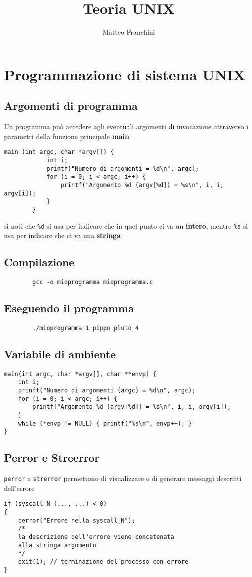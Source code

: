 \documentclass[italian,12pt,a4paper]{article}
\title{Teoria UNIX}
\author{Matteo Franchini}
\begin{document}
	\maketitle
	\tableofcontents
	\section{Programmazione di sistema UNIX}
	\subsection{Argomenti di programma}
	Un programma può accedere agli eventuali argomenti di invocazione attraverso i parametri della funzione principale \textbf{main}
	\begin{lstlisting}[xleftmargin=-5.5cm]
		main (int argc, char *argv[]) {
			int i;
			printf("Numero di argomenti = %d\n", argc);
			for (i = 0; i < argc; i++) {
				printf("Argomento %d (argv[%d]) = %s\n", i, i, argv[i]);
			}
		}
	\end{lstlisting}
	si noti che \verb|%d| si usa per indicare che in quel punto ci va un \textbf{intero}, mentre \verb|%s| si usa per indicare che ci va una \textbf{stringa}
	\subsection{Compilazione}
	\begin{verbatim}
		gcc -o mioprogramma mioprogramma.c
	\end{verbatim}
	\subsection{Eseguendo il programma}
	\begin{verbatim}
		./mioprogramma 1 pippo pluto 4
	\end{verbatim}
	\newpage
	\subsection{Variabile di ambiente}
	\begin{lstlisting}[xleftmargin=-1 cm]
main(int argc, char *argv[], char **envp) {
	int i;
	prinft("Numero di argomenti (argc) = %d\n", argc);
	for (i = 0; i < argc; i++) {
		printf("Argomento %d (argv[%d]) = %s\n", i, i, argv[i]);
	}
	while (*envp != NULL) { printf("%s\n", envp++); }
}
	\end{lstlisting}
	\subsection{Perror e Streerror}
	\verb|perror| e \verb|strerror| permettono di visualizzare o di generare messaggi descritti dell'errore
	\begin{lstlisting}
if (syscall_N (..., ...) < 0)
{
	perror("Errore nella syscall_N");
	/*
	la descrizione dell'errore viene concatenata 
	alla stringa argomento
	*/
	exit(1); // terminazione del processo con errore	
}
	\end{lstlisting}
\end{document}
